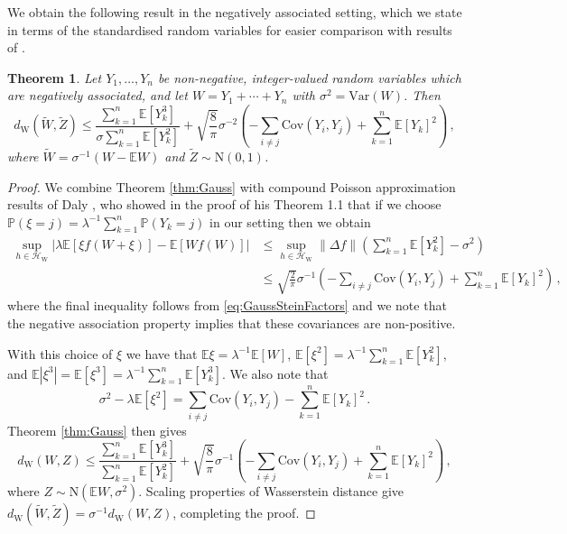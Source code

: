 \documentclass[12pt]{article}
\newtheorem{theorem}{Theorem}
\begin{document}
We obtain the following result in the negatively associated setting, which we state in terms of the standardised random variables for easier comparison with results of \cite{wiroonsri18}.
\begin{theorem}\label{thm:negass}
Let $Y_1,\ldots,Y_n$ be non-negative, integer-valued random variables which are negatively associated, and let $W=Y_1+\cdots+Y_n$ with $\sigma^2=\text{Var}(W)$. Then
\[
d_\text{W}(\widetilde{W},\widetilde{Z})\leq \frac{\sum_{k=1}^n\mathbb{E}[Y_k^3]}{\sigma\sum_{k=1}^n\mathbb{E}[Y_k^2]}
+\sqrt{\frac{8}{\pi}}\sigma^{-2}\left(-\sum_{i\not=j}\text{Cov}(Y_i,Y_j)+\sum_{k=1}^n\mathbb{E}[Y_k]^2\right)\,,
\]  
where $\widetilde{W}=\sigma^{-1}(W-\mathbb{E}W)$ and $\widetilde{Z}\sim\text{N}(0,1)$.
\end{theorem}  
\begin{proof}
We combine Theorem \ref{thm:Gauss} with compound Poisson approximation results of Daly \cite{daly13}, who showed in the proof of his Theorem 1.1 that if we choose $\mathbb{P}(\xi=j)=\lambda^{-1}\sum_{k=1}^n\mathbb{P}(Y_k=j)$ in our setting then we obtain
\begin{align*}
\sup_{h\in\mathcal{H}_{\text{W}}}\left|\lambda\mathbb{E}[\xi f(W+\xi)]-\mathbb{E}[Wf(W)]\right|&\leq\sup_{h\in\mathcal{H}_{\text{W}}}\lVert\Delta f\rVert\left(\sum_{k=1}^n\mathbb{E}[Y_k^2]-\sigma^2\right)\\
&\leq\sqrt{\frac{2}{\pi}}\sigma^{-1}\left(-\sum_{i\not=j}\text{Cov}(Y_i,Y_j)+\sum_{k=1}^n\mathbb{E}[Y_k]^2\right)\,,
\end{align*}
where the final inequality follows from \eqref{eq:GaussSteinFactors} and we note that the negative association property implies that these covariances are non-positive.

With this choice of $\xi$ we have that $\mathbb{E}\xi=\lambda^{-1}\mathbb{E}[W]$, $\mathbb{E}[\xi^2]=\lambda^{-1}\sum_{k=1}^n\mathbb{E}[Y_k^2]$, and $\mathbb{E}|\xi^3|=\mathbb{E}[\xi^3]=\lambda^{-1}\sum_{k=1}^n\mathbb{E}[Y_k^3]$. We also note that
\[
\sigma^2-\lambda\mathbb{E}[\xi^2]=\sum_{i\not=j}\text{Cov}(Y_i,Y_j)-\sum_{k=1}^n\mathbb{E}[Y_k]^2\,.
\]
Theorem \ref{thm:Gauss} then gives
\[
d_\text{W}(W,Z)\leq \frac{\sum_{k=1}^n\mathbb{E}[Y_k^3]}{\sum_{k=1}^n\mathbb{E}[Y_k^2]}
+\sqrt{\frac{8}{\pi}}\sigma^{-1}\left(-\sum_{i\not=j}\text{Cov}(Y_i,Y_j)+\sum_{k=1}^n\mathbb{E}[Y_k]^2\right)\,,
\]
where $Z\sim\text{N}(\mathbb{E}W,\sigma^2)$. Scaling properties of Wasserstein distance give $d_\text{W}(\widetilde{W},\widetilde{Z})=\sigma^{-1}d_\text{W}(W,Z)$, completing the proof.
\end{proof}
\end{document}
